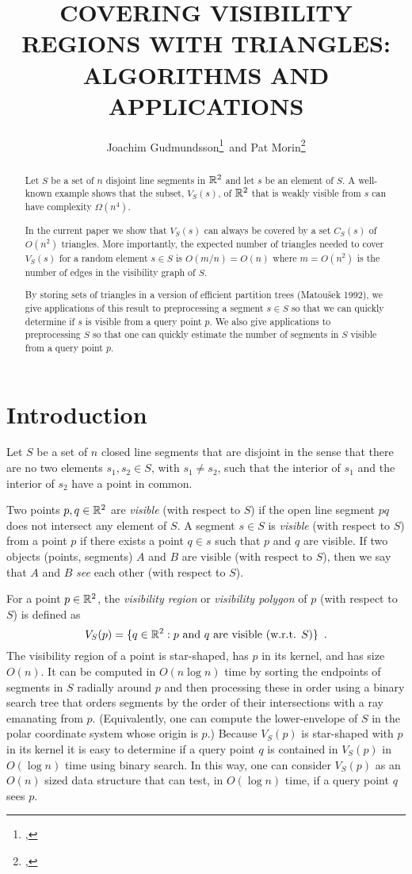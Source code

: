 \documentclass{patmorin}
\title{\MakeUppercase{Covering Visibility Regions with Triangles:\newline
       Algorithms and Applications}}
\author{Joachim Gudmundsson\thanks{\affil{NICTA},
\email{joachim.gudmundsson@nicta.com.au}}\, 
       and Pat Morin\thanks{\affil{Carleton University},
\email{morin@scs.carleton.ca}}}
\begin{document}
\maketitle
\begin{abstract}
Let $S$ be a set of $n$ disjoint line segments in $\mathbb{R}^2$ and let $s$ be an
element of $S$.  A well-known example shows that the subset, $V_S(s)$, of
$\mathbb{R}^2$ that is weakly visible from $s$ can have complexity $\Omega(n^4)$.

In the current paper we show that $V_S(s)$ can always be covered by a set
$C_S(s)$ of $O(n^2)$ triangles.  More importantly, the expected number
of triangles needed to cover $V_S(s)$ for a random element $s\in S$ is
$O(m/n)=O(n)$ where $m=O(n^2)$ is the number of edges in the visibility
graph of $S$.

By storing sets of triangles in a version of efficient partition trees
(Matou\v{s}ek 1992), we give applications of this result to preprocessing
a segment $s\in S$ so that we can quickly determine if $s$ is visible
from a query point $p$.  We also give applications to preprocessing $S$
so that one can quickly estimate the number of segments in $S$ visible
from a query point $p$.
\end{abstract}

\section{Introduction}

Let $S$ be a set of $n$ closed line segments that are disjoint in the
sense that there are no two elements $s_1,s_2\in S$, with $s_1\neq s_2$,
such that the interior of $s_1$ and the interior of $s_2$ have a point
in common.

Two points $p,q\in\mathbb{R}^2$ are \emph{visible} (with respect to $S$) if the
open line segment $pq$ does not intersect any element of $S$.  A segment
$s\in S$ is \emph{visible} (with respect to $S$) from a point $p$ if there
exists a point $q\in s$ such that $p$ and $q$ are visible.  If two objects
(points, segments) $A$ and $B$ are visible (with respect to $S$), then we
say that $A$ and $B$ \emph{see} each other (with respect to $S$).

For a point $p\in\mathbb{R}^2$, the \emph{visibility region} or \emph{visibility
polygon} of $p$ (with respect to $S$) is defined as
\[
   V_S(p)=\{q\in\mathbb{R}^2:\mbox{$p$ and $q$ are visible (w.r.t. $S$)}\} 
      \enspace .
\]
The visibility region of a point is star-shaped, has $p$ in its kernel,
and has size $O(n)$. It can be computed in $O(n\log n)$ time by sorting
the endpoints of segments in $S$ radially around $p$ and then processing
these in order using a binary search tree that orders segments by the
order of their intersections with a ray emanating from $p$. (Equivalently,
one can compute the lower-envelope of $S$ in the polar coordinate
system whose origin is $p$.)  Because $V_S(p)$ is star-shaped with $p$
in its kernel it is easy to determine if a query point $q$ is contained
in $V_S(p)$ in $O(\log n)$ time using binary search. In this way, one
can consider $V_S(p)$ as an $O(n)$ sized data structure that can test,
in $O(\log n)$ time, if a query point $q$ sees $p$.
\end{document}
